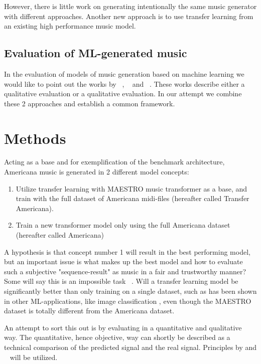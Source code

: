\documentclass{IEEEtran}
\begin{document}
However, there is little work on generating intentionally the same music
generator with different approaches. Another new approach is to use transfer
learning from an existing high performance music model.

\subsection{Evaluation of ML-generated music}

In the evaluation of models of
music generation based on machine learning we would like to point out the
works by \citeauthor{1030094}~\cite{1030094},
\citeauthor{yang2020evaluation}~\cite{yang2020evaluation} and
\citeauthor{wu2020jazz}~\cite{wu2020jazz}. These works describe either a
qualitative evaluation or a qualitative evaluation. In our attempt we combine
these 2 approaches and establish a common framework.

\section{Methods}

Acting as a base and for exemplification of the benchmark architecture,
Americana music is generated in 2 different model concepts: \begin{enumerate}
\item Utilize transfer learning with MAESTRO music transformer as a base, and
train with the full dataset of Americana midi-files (hereafter called
Transfer Americana). \item Train a new transformer model only using the full
Americana dataset (hereafter called Americana) \end{enumerate}

A hypothesis is that concept number 1 will result in the best performing
model, but an important issue is what makes up the best model and how to
evaluate such a subjective "sequence-result" as music in a fair and
trustworthy manner? Some will say this is an impossible task ~\cite{1030094}.
Will a transfer learning model be significantly better than only training on
a single dataset, such as has been shown in other ML-applications, like image
classification \cite{7404017}, even though the MAESTRO dataset is totally
different from the Americana dataset.

An attempt to sort this out is by evaluating in a quantitative and
qualitative way. The quantitative, hence objective, way can shortly be
described as a technical comparison of the predicted signal and the real
signal. Principles by \cite{yang2020evaluation} and ~\cite{wu2020jazz} will
be utilized.
\end{document}
